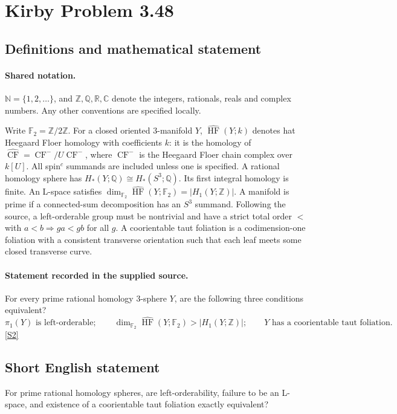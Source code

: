 \documentclass[11pt]{article}
\newcommand{\sref}[2]{\hyperlink{source:#1:#2}{[S#2]}}
\begin{document}
\section{Kirby Problem 3.48}\label{statement}

\subsection{Definitions and mathematical statement}

\paragraph{Shared notation.}$\mathbb N=\{1,2,\ldots\}$, and $\mathbb Z,\mathbb Q,\mathbb R,\mathbb C$ denote the integers, rationals, reals and complex numbers. Any other conventions are specified locally.


Write $\mathbb F_2=\mathbb Z/2\mathbb Z$. For a closed oriented $3$-manifold $Y$, $\widehat{\operatorname{HF}}(Y;k)$ denotes hat Heegaard Floer homology with coefficients $k$: it is the homology of $\widehat{\operatorname{CF}}=\operatorname{CF}^-/U\operatorname{CF}^-$, where $\operatorname{CF}^-$ is the Heegaard Floer chain complex over $k[U]$. All spin$^c$ summands are included unless one is specified. A rational homology sphere has $H_*(Y;\mathbb Q)\cong H_*(S^3;\mathbb Q)$. Its first integral homology is finite. An L-space satisfies $\dim_{\mathbb F_2}\widehat{\operatorname{HF}}(Y;\mathbb F_2)=|H_1(Y;\mathbb Z)|$. A manifold is prime if a connected-sum decomposition has an $S^3$ summand. Following the source, a left-orderable group must be nontrivial and have a strict total order $<$ with $a<b\Rightarrow ga<gb$ for all $g$. A coorientable taut foliation is a codimension-one foliation with a consistent transverse orientation such that each leaf meets some closed transverse curve. 
\paragraph{Statement recorded in the supplied source.}
For every prime rational homology $3$-sphere $Y$, are the following three conditions equivalent?
\[
\pi_1(Y)\text{ is left-orderable};\qquad
\dim_{\mathbb F_2}\widehat{\operatorname{HF}}(Y;\mathbb F_2)>|H_1(Y;\mathbb Z)|;\qquad
Y\text{ has a coorientable taut foliation}.
\]
\sref{statement}{2}
\subsection{Short English statement}
For prime rational homology spheres, are left-orderability, failure to be an L-space, and existence of a coorientable taut foliation exactly equivalent?
\end{document}
